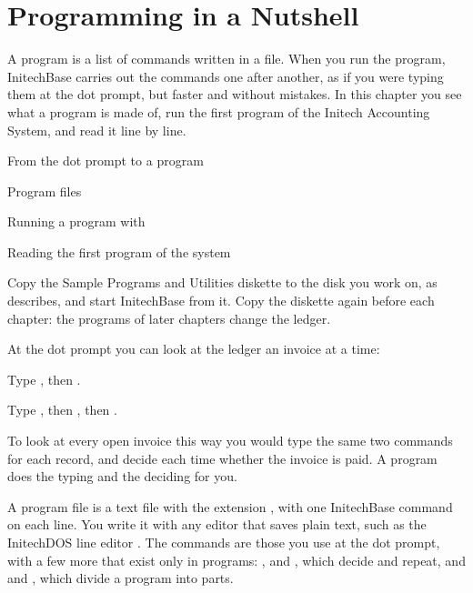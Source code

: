 \chapter{Programming in a Nutshell}
A program is a list of commands written in a file.  When you run the program,
InitechBase carries out the commands one after another, as if you were typing
them at the dot prompt, but faster and without mistakes.  In this chapter you
see what a program is made of, run the first program of the Initech Accounting
System, and read it line by line.

\begin{ChapterCovers}
\item From the dot prompt to a program
\item Program files
\item Running a program with 
\item Reading the first program of the system
\end{ChapterCovers}

Copy the Sample Programs and Utilities diskette to the disk you work on, as
 describes, and start InitechBase from it.  Copy the
diskette again before each chapter: the programs of later chapters change the
ledger.

At the dot prompt you can look at the ledger an invoice at a time:
\begin{Steps}
\item Type , then .
\item Type , then , then .
\end{Steps}
To look at every open invoice this way you would type the same two commands
for each record, and decide each time whether the invoice is paid.  A program
does the typing and the deciding for you.

A program file is a text file with the extension , with one
InitechBase command on each line.  You write it with any editor that saves
plain text, such as the InitechDOS line editor .  The commands are
those you use at the dot prompt, with a few more that exist only in programs:
,  and , which decide and repeat, and
 and , which divide a program into parts.

